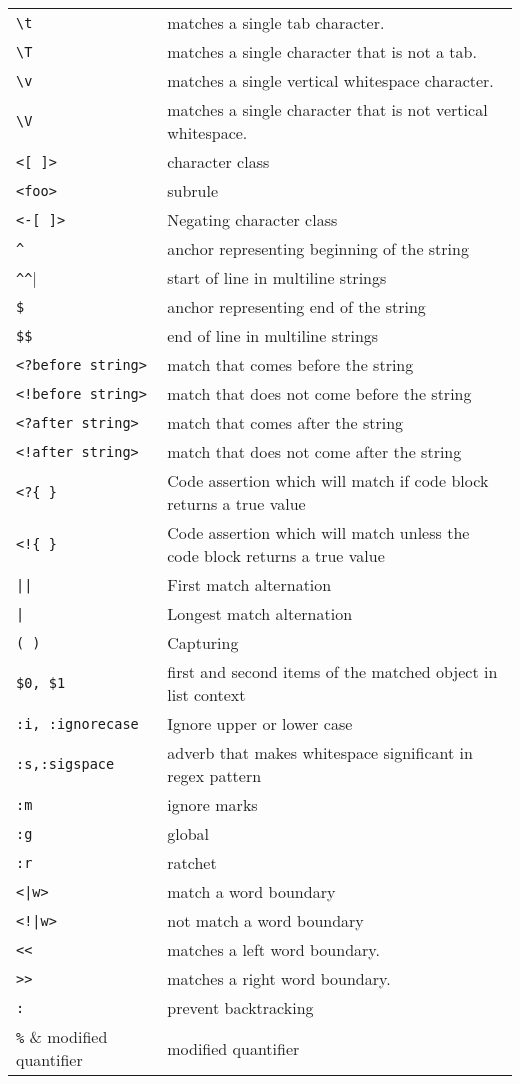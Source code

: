 \documentclass[12pt]{article}
\begin{document}
\begin{longtable}{@{}lp{12cm}}
		\verb|\t| & matches a single tab character.\\
		\verb|\T| & matches a single character that is not a tab.\\
		\verb|\v| & matches a single vertical whitespace character.\\
		\verb|\V| & matches a single character that is not vertical whitespace.\\		
		\verb|<[ ]>|	& character class\\
		\verb|<foo>| & subrule\\
		\verb|<-[ ]>|	& Negating character class\\
		\verb|^|	& anchor representing beginning of the string\\
		\verb|^^|	& start of line in multiline strings\\
		\verb|$|	& anchor representing end of the string\\
		\verb|$$|	& end of line in multiline strings\\
		\verb|<?before string>|	& match that comes before the string\\
		\verb|<!before string>|	& match that does not come before the string\\
		\verb|<?after string>|	& match that comes after the string\\
		\verb|<!after string>|	& match that does not come after the string\\
		\verb|<?{ }|	& Code assertion which will match if code block returns a true value\\
		\verb|<!{ }|	& Code assertion which will match unless the code block returns a true value\\
		\verb!||!	& First match alternation\\
		\verb!|!	& Longest match alternation\\
		\verb|( )|	& Capturing\\
		\verb|$0, $1|	& first and second items of the matched object in list context\\
		\verb|:i, :ignorecase|	& Ignore upper or lower case\\
		\verb|:s,:sigspace|	& adverb that makes whitespace significant in regex pattern\\				
		\verb|:m|   & ignore marks\\
		\verb|:g|   & global\\
		\verb|:r|   & ratchet\\
		\verb!<|w>! & match a word boundary\\
		\texttt{<!|w>} & not match a word boundary\\
		\verb|<<| & matches a left word boundary.\\
		\verb|>>| & matches a right word boundary.\\
		\verb|:| & prevent backtracking\\
		\verb|%| & modified quantifier\\
		
	\end{longtable}
\end{document}
